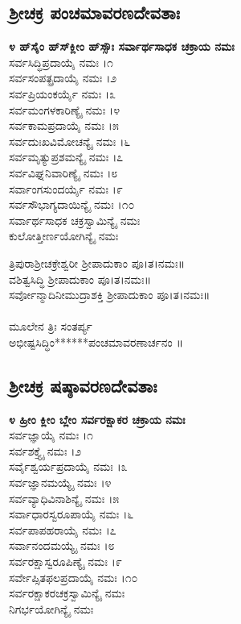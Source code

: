 \subsection{ಶ್ರೀಚಕ್ರ ಪಂಚಮಾವರಣದೇವತಾಃ}
{\bfseries ೪ ಹ್‌ಸೈಂ ಹ್‌ಸ್‌ಕ್ಲೀಂ ಹ್‌ಸ್ಸೌಃ ಸರ್ವಾರ್ಥಸಾಧಕ ಚಕ್ರಾಯ ನಮಃ}\\
 ಸರ್ವಸಿದ್ಧಿಪ್ರದಾಯೈ ನಮಃ ।೧\\
 ಸರ್ವಸಂಪತ್ಪ್ರದಾಯೈ ನಮಃ ।೨\\
 ಸರ್ವಪ್ರಿಯಂಕರ್ಯೈ ನಮಃ ।೩\\
 ಸರ್ವಮಂಗಳಕಾರಿಣ್ಯೈ ನಮಃ ।೪\\
 ಸರ್ವಕಾಮಪ್ರದಾಯೈ ನಮಃ ।೫\\
 ಸರ್ವದುಃಖವಿಮೋಚನ್ಯೈ ನಮಃ ।೬\\
 ಸರ್ವಮೃತ್ಯುಪ್ರಶಮನ್ಯೈ ನಮಃ ।೭\\
 ಸರ್ವವಿಘ್ನನಿವಾರಿಣ್ಯೈ ನಮಃ ।೮\\
 ಸರ್ವಾಂಗಸುಂದರ್ಯೈ ನಮಃ ।೯\\
 ಸರ್ವಸೌಭಾಗ್ಯದಾಯಿನ್ಯೈ ನಮಃ ।೧೦\\
 ಸರ್ವಾರ್ಥಸಾಧಕ ಚಕ್ರಸ್ವಾಮಿನ್ಯೈ ನಮಃ\\
ಕುಲೋತ್ತೀರ್ಣಯೋಗಿನ್ಯೈ ನಮಃ

 ತ್ರಿಪುರಾಶ್ರೀಚಕ್ರೇಶ್ವರೀ ಶ್ರೀಪಾದುಕಾಂ ಪೂ।ತ।ನಮಃ॥\\
 ವಶಿತ್ವಸಿದ್ಧಿ ಶ್ರೀಪಾದುಕಾಂ ಪೂ।ತ।ನಮಃ॥\\
ಸರ್ವೋನ್ಮಾದಿನೀಮುದ್ರಾಶಕ್ತಿ ಶ್ರೀಪಾದುಕಾಂ ಪೂ।ತ।ನಮಃ॥\\
\\
ಮೂಲೇನ ತ್ರಿಃ ಸಂತರ್ಪ್ಯ\\
 ಅಭೀಷ್ಟಸಿದ್ಧಿಂ******ಪಂಚಮಾವರಣಾರ್ಚನಂ ॥
\newpage
\subsection{ಶ್ರೀಚಕ್ರ ಷಷ್ಠಾವರಣದೇವತಾಃ}
{\bfseries ೪ ಹ್ರೀಂ ಕ್ಲೀಂ ಬ್ಲೇಂ ಸರ್ವರಕ್ಷಾಕರ ಚಕ್ರಾಯ ನಮಃ}\\
 ಸರ್ವಜ್ಞಾಯೈ ನಮಃ ।೧\\
 ಸರ್ವಶಕ್ತ್ಯೈ ನಮಃ ।೨\\
 ಸರ್ವೈಶ್ವರ್ಯಪ್ರದಾಯೈ ನಮಃ ।೩\\
 ಸರ್ವಜ್ಞಾನಮಯ್ಯೈ ನಮಃ ।೪\\
 ಸರ್ವವ್ಯಾಧಿವಿನಾಶಿನ್ಯೈ ನಮಃ ।೫\\
 ಸರ್ವಾಧಾರಸ್ವರೂಪಾಯೈ ನಮಃ ।೬\\
 ಸರ್ವಪಾಪಹರಾಯೈ ನಮಃ ।೭\\
 ಸರ್ವಾನಂದಮಯ್ಯೈ ನಮಃ ।೮\\
 ಸರ್ವರಕ್ಷಾಸ್ವರೂಪಿಣ್ಯೈ ನಮಃ ।೯\\
 ಸರ್ವೇಪ್ಸಿತಫಲಪ್ರದಾಯೈ ನಮಃ ।೧೦\\
 ಸರ್ವರಕ್ಷಾಕರಚಕ್ರಸ್ವಾಮಿನ್ಯೈ ನಮಃ\\
ನಿಗರ್ಭಯೋಗಿನ್ಯೈ ನಮಃ

